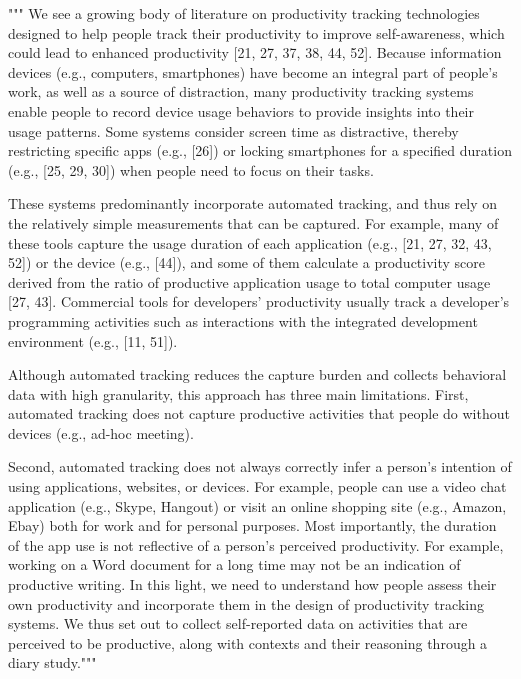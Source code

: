 


"""
We see a growing body of literature on productivity tracking technologies designed to help people
track their productivity to improve self-awareness,
which could lead to enhanced productivity [21, 27, 37, 38, 44, 52].
Because information devices (e.g., computers, smartphones)
have become an integral part of people's work, as well as a source of distraction,
many productivity tracking systems enable people to record device usage behaviors to provide insights
into their usage patterns. Some systems consider screen time as distractive, thereby restricting specific apps
(e.g., [26]) or locking smartphones for a specified duration
(e.g., [25, 29, 30]) when people need to focus on their tasks.

These systems predominantly incorporate automated tracking, and thus rely on the relatively simple measurements that can be captured. For example, many of these tools capture the usage duration of each application (e.g., [21, 27, 32, 43, 52]) or the device (e.g., [44]), and some of them calculate a productivity score derived from the ratio of productive application usage to total computer usage  [27, 43]. Commercial tools for developers’ productivity usually track a developer's programming activities such as interactions with the integrated development environment (e.g., [11, 51]).

Although automated tracking reduces the capture burden and collects behavioral data with high granularity,
this approach has three main limitations.
First, automated tracking does not capture productive activities that people do without devices (e.g., ad-hoc meeting).

Second, automated tracking does not always correctly infer a person's intention of using applications, websites, or devices.
For example, people can use a video chat application (e.g., Skype, Hangout) or visit an online shopping site (e.g., Amazon, Ebay)
both for work and for personal purposes. Most importantly, the duration of the app use is not reflective of a person's perceived productivity. For example, working on a Word document for a long time may not be an indication of productive writing. In this light, we need to understand how people assess their own productivity and incorporate them in the design of productivity tracking systems. We thus set out to collect self-reported data on activities that are perceived to be productive, along with contexts and their reasoning through a diary study."""
\cite{Kim2019May}




